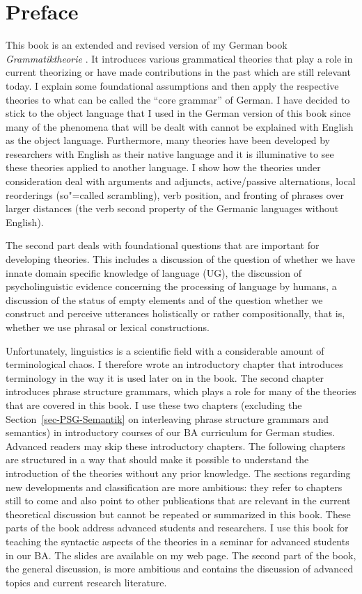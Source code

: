 \chapter*{Preface}

This book is an extended and revised version of my German book \emph{Grammatiktheorie}
\citep{MuellerGTBuch2}. It introduces various grammatical theories that play a role in current
theorizing or have made contributions in the past which are still relevant today. I explain some foundational
assumptions and then apply the respective theories to what can be called the ``core grammar'' of
German. I have decided to stick to the object language that I used in the German version of this
book since many of the phenomena that will be dealt with cannot be explained with English as the object
language. Furthermore, many theories have been developed by researchers with English as their native
language and it is illuminative to see these theories applied to another language.
I show how the theories under consideration deal with arguments and adjuncts, active/passive
alternations, local reorderings (so"=called scrambling), verb position, and fronting of phrases over
larger distances (the verb second property of the Germanic languages without English).

The second part deals with foundational questions that are important for developing theories.
This includes a discussion of the question of whether we have innate domain specific knowledge of
language (UG), the discussion of psycholinguistic evidence concerning the processing of language by
humans, a discussion of the status of empty elements and of the question whether we construct and perceive utterances 
holistically or rather compositionally, that is, whether we use phrasal or lexical constructions.

Unfortunately, linguistics is a scientific field 
with a considerable amount of terminological chaos. I therefore wrote an introductory
chapter that introduces terminology in the way it is used later on in the book. The second chapter
introduces phrase structure grammars, which plays a role for many of the theories that are covered
in this book. I use these two chapters (excluding the Section~\ref{sec-PSG-Semantik} on interleaving
phrase structure grammars and semantics) in introductory courses of our BA curriculum for German
studies. Advanced readers may skip these introductory chapters. The following chapters are
structured in a way that should make it possible to understand the introduction of the theories
without any prior knowledge. The sections regarding new developments and classification are more
ambitious: they refer to chapters still to come and also point to other publications that are
relevant in the current theoretical discussion but cannot be repeated or summarized in this
book. These parts of the book address advanced students and researchers. I use this book for teaching
the syntactic aspects of the theories in a seminar for advanced students in our BA. The slides are
available on my web page. The second part of the book, the general discussion, is more ambitious and contains the discussion
of advanced topics and current research literature.

